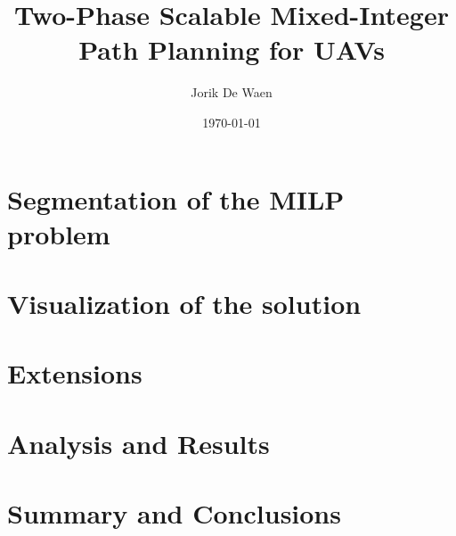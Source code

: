 \documentclass[12pt]{article}
\title{Two-Phase Scalable Mixed-Integer Path Planning for UAVs}
\author{Jorik De Waen}
\date{\today}
\begin{document}
\maketitle





\section{Segmentation of the MILP problem}
\label{section:segment}

\section{Visualization of the solution}
\label{section:visual}

\section{Extensions}
\label{section:extension}

\section{Analysis and Results}
\label{section:result}

\section{Summary and Conclusions}
\label{section:summary}



\end{document}
